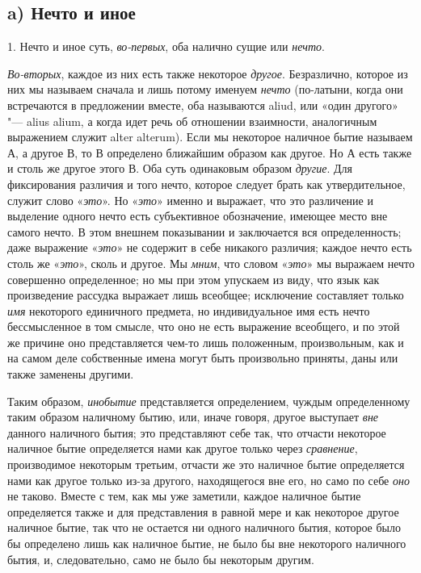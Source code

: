 \subsection*{a) Нечто и иное}
1. Нечто и иное суть, {\em во-первых}, оба налично
сущие или {\em нечто}.

{\em Во-вторых}, каждое из них есть также некоторое
{\em другое}. Безразлично, которое из них мы называем
сначала и лишь потому именуем {\em нечто} (по-латыни,
когда они встречаются в предложении вместе, оба называются aliud, или «один
другого» "--- alius alium, а когда идет речь об отношении взаимности,
аналогичным выражением служит alter alterum). Если мы некоторое наличное
бытие называем А, а другое В, то В определено ближайшим образом как другое.
Но А есть также и столь же другое этого В. Оба суть одинаковым образом
{\em другие}. Для фиксирования различия и того нечто,
которое следует брать как утвердительное, служит слово
«{\em это}». Но «{\em это}» именно
и выражает, что это различение и выделение одного нечто есть субъективное
обозначение, имеющее место вне самого нечто. В этом внешнем показывании и
заключается вся определенность; даже выражение
«{\em это}» не содержит в себе никакого различия;
каждое нечто есть столь же «{\em это}», сколь и другое.
Мы {\em мним}, что словом
«{\em это}» мы выражаем нечто совершенно определенное;
но мы при этом упускаем из виду, что язык как произведение рассудка
выражает лишь всеобщее; исключение составляет только
{\em имя} некоторого единичного предмета, но
индивидуальное имя есть нечто бессмысленное в том смысле, что оно не есть
выражение всеобщего, и по этой же причине оно представляется чем-то лишь
положенным, произвольным, как и на самом деле собственные имена могут быть
произвольно приняты, даны или также заменены другими.

Таким образом, {\em инобытие} представляется
определением, чуждым определенному таким образом наличному бытию, или,
иначе говоря, другое выступает {\em вне} данного
наличного бытия; это представляют себе так, что отчасти некоторое наличное
бытие определяется нами как другое только через
{\em сравнение}, производимое некоторым третьим,
отчасти же это наличное бытие определяется нами как другое только из-за
другого, находящегося вне его, но само по себе
{\em оно} не таково. Вместе с тем, как мы уже заметили,
каждое наличное бытие определяется также и для представления в равной мере
и как некоторое другое наличное бытие, так что не остается ни одного
наличного бытия, которое было бы определено лишь как наличное бытие, не
было бы вне некоторого наличного бытия, и, следовательно, само не было бы
некоторым другим.

